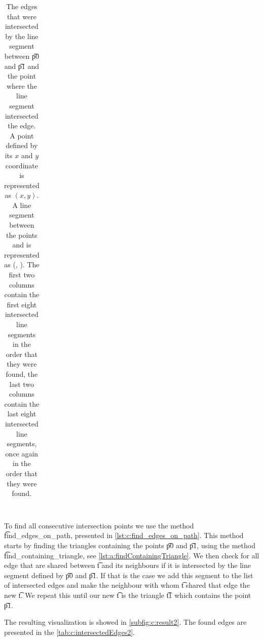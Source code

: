 \begin{table}
{\begin{tabular}{ll|ll}
		\end{tabular}
	}
	\caption{The edges that were intersected by the line segment between \t{p0} and \t{p1} and the point where the line segment intersected the edge. A point  defined by its $x$ and $y$ coordinate is represented as $(x, y)$. A line segment between the points  and  is represented as (, ). The first two columns contain the first eight intersected line segments in the order that they were found, the last two columns contain the last eight intersected line segments, once again in the order that they were found.}
	\label{tab:c:intersectedEdges1}
\end{table}

~\\

\noindent To find all consecutive intersection points we use the method \t{find_edges_on_path}, presented in \autoref{lst:c:find_edges_on_path}. This method starts by finding the triangles containing the points \t{p0} and \t{p1}, using the method \t{find_containing_triangle}, see \autoref{lst:a:findContainingTriangle}. We then check for all edge that are shared between \t{t} and its neighbours if it is intersected by the line segment defined by \t{p0} and \t{p1}. If that is the case we add this segment to the list of intersected edges and make the neighbour with whom \t{t} shared that edge the new \t{t}. We repeat this until our new \t{t} is the triangle \t{t1} which contains the point \t{p1}. 

The resulting visualization is showed in \autoref{subfig:c:result2}. The found edges are presented in the \autoref{tab:c:intersectedEdges2}.

